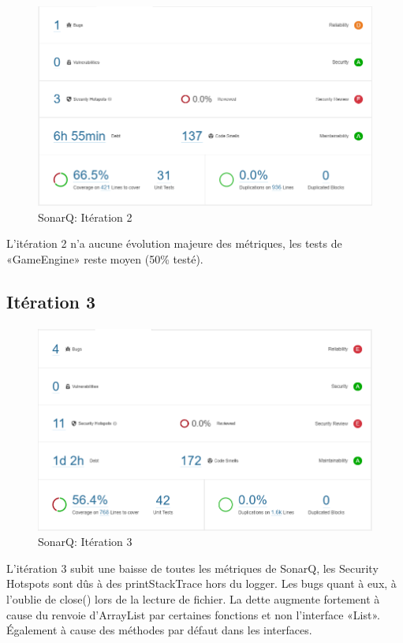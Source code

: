 \documentclass[13pt ,a4paper ]{report}
\begin{document}
\begin{multicols}{2}
	\paragraph{}
        \begin{figure}[H]
      	\begin{center}
			\includegraphics[scale=0.3]{2.png}
			\caption{SonarQ: Itération 2}
		\end{center}
		\end{figure}
L’itération 2 n’a aucune évolution majeure des métriques, les tests de «GameEngine» reste moyen (50\% testé). 
  	\subsection{Itération 3}
	\paragraph{}
        \begin{figure}[H]
      	\begin{center}
			\includegraphics[scale=0.3]{3.png}
			\caption{SonarQ: Itération 3}
		\end{center}
		\end{figure}
L’itération 3 subit une baisse de toutes les métriques de SonarQ, les Security Hotspots sont dûs à des printStackTrace hors du logger. Les bugs quant à eux, à l’oublie de close() lors de la lecture de fichier.
La dette augmente fortement à cause du renvoie d’ArrayList par certaines fonctions et non l’interface «List». Également à cause des méthodes par défaut dans les interfaces.

\end{multicols}
\end{document}
